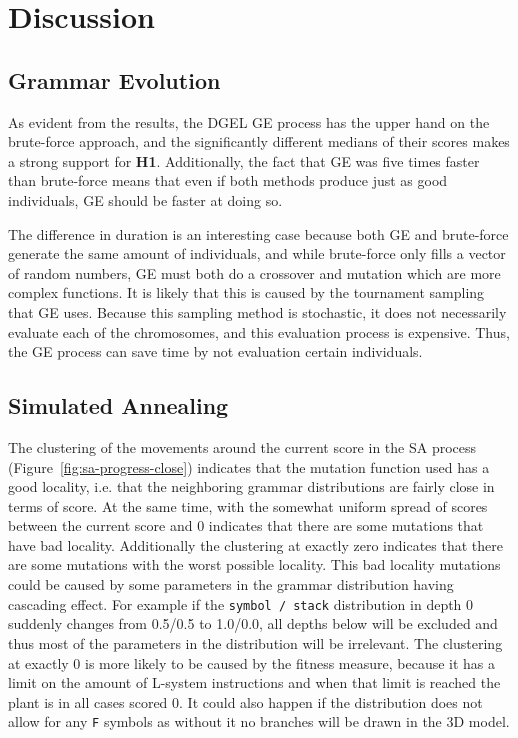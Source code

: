 \chapter{Discussion}
\section{Grammar Evolution}
As evident from the results, the \gls{DGEL} \gls{GE} process has the upper hand on the brute-force approach, and the significantly different medians of their scores makes a strong support for \textbf{H1}.
Additionally, the fact that \gls{GE} was five times faster than brute-force means that even if both methods produce just as good individuals, \gls{GE} should be faster at doing so.

The difference in duration is an interesting case because both \gls{GE} and brute-force generate the same amount of individuals, and while brute-force only fills a vector of random numbers, \gls{GE} must both do a crossover and mutation which are more complex functions.
It is likely that this is caused by the tournament sampling that \gls{GE} uses.
Because this sampling method is stochastic, it does not necessarily evaluate each of the chromosomes, and this evaluation process is expensive.
Thus, the \gls{GE} process can save time by not evaluation certain individuals.

\section{Simulated Annealing}
The clustering of the movements around the current score in the \gls{SA} process (Figure~\ref{fig:sa-progress-close}) indicates that the mutation function used has a good locality, i.e. that the neighboring grammar distributions are fairly close in terms of score.
At the same time, with the somewhat uniform spread of scores between the current score and 0 indicates that there are some mutations that have bad locality.
Additionally the clustering at exactly zero indicates that there are some mutations with the worst possible locality.
This bad locality mutations could be caused by some parameters in the grammar distribution having cascading effect.
For example if the \texttt{symbol / stack} distribution in depth 0 suddenly changes from 0.5/0.5 to 1.0/0.0, all depths below will be excluded and thus most of the parameters in the distribution will be irrelevant.
The clustering at exactly 0 is more likely to be caused by the fitness measure, because it has a limit on the amount of \gls{L-system} instructions and when that limit is reached the plant is in all cases scored 0.
It could also happen if the distribution does not allow for any \texttt{F} symbols as without it no branches will be drawn in the 3D model.

